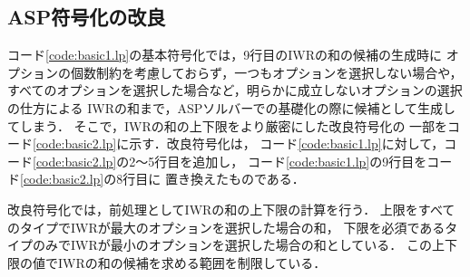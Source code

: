 \subsection{ASP符号化の改良}
 

コード\ref{code:basic1.lp}の基本符号化では，9行目のIWRの和の候補の生成時に
オプションの個数制約を考慮しておらず，一つもオプションを選択しない場合や，
すべてのオプションを選択した場合など，明らかに成立しないオプションの選択の仕方による
IWRの和まで，ASPソルバーでの基礎化の際に候補として生成してしまう．
そこで，IWRの和の上下限をより厳密にした改良符号化の
一部をコード\ref{code:basic2.lp}に示す．改良符号化は，
コード\ref{code:basic1.lp}に対して，コード\ref{code:basic2.lp}の2〜5行目を追加し，
コード\ref{code:basic1.lp}の9行目をコード\ref{code:basic2.lp}の8行目に
置き換えたものである．

改良符号化では，前処理としてIWRの和の上下限の計算を行う．
上限をすべてのタイプでIWRが最大のオプションを選択した場合の和，
下限を必須であるタイプのみでIWRが最小のオプションを選択した場合の和としている．
この上下限の値でIWRの和の候補を求める範囲を制限している．
